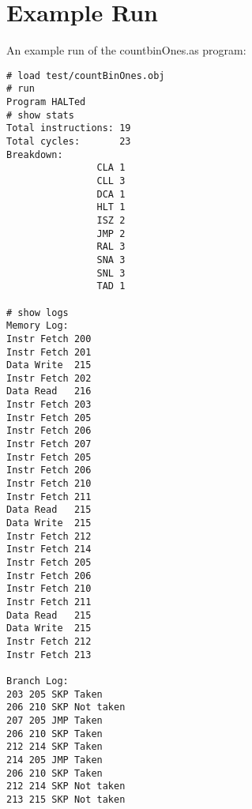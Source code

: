 \documentclass[11pt]{exam}
\begin{document}
\section{Example Run}
An example run of the countbinOnes.as program:

\begin{multicols}{2}
{\small
\begin{verbatim}
# load test/countBinOnes.obj
# run
Program HALTed
# show stats
Total instructions: 19
Total cycles:       23
Breakdown:        
                CLA 1
                CLL 3
                DCA 1
                HLT 1
                ISZ 2
                JMP 2
                RAL 3
                SNA 3
                SNL 3
                TAD 1

# show logs
Memory Log:
Instr Fetch 200
Instr Fetch 201
Data Write  215
Instr Fetch 202
Data Read   216
Instr Fetch 203
Instr Fetch 205
Instr Fetch 206
Instr Fetch 207
Instr Fetch 205
Instr Fetch 206
Instr Fetch 210
Instr Fetch 211
Data Read   215
Data Write  215
Instr Fetch 212
Instr Fetch 214
Instr Fetch 205
Instr Fetch 206
Instr Fetch 210
Instr Fetch 211
Data Read   215
Data Write  215
Instr Fetch 212
Instr Fetch 213

Branch Log:
203 205 SKP Taken
206 210 SKP Not taken
207 205 JMP Taken
206 210 SKP Taken
212 214 SKP Taken
214 205 JMP Taken
206 210 SKP Taken
212 214 SKP Not taken
213 215 SKP Not taken
\end{verbatim}
}
\end{multicols}
\end{document}
